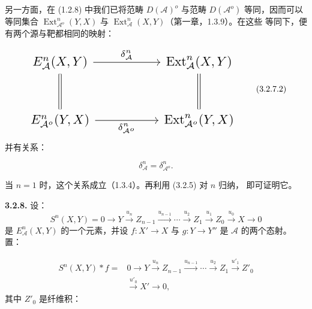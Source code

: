 \clearpage
{}%
\begingroup\small\setlength{\parskip}{0pt}\setlength{\emergencystretch}{1.5em}
\setlength{\abovedisplayskip}{4pt plus 2pt minus 2pt}%
\setlength{\belowdisplayskip}{4pt plus 2pt minus 2pt}%

另一方面，在 (1.2.8) 中我们已将范畴 $D(\mathcal A)^o$ 与范畴
$D(\mathcal A^o)$ 等同，因而可以等同集合
$\operatorname{Ext}_{\mathcal A^o}^{n}(Y,X)$ 与
$\operatorname{Ext}_{\mathcal A}^{n}(X,Y)$（第一章，1.3.9）。在这些
等同下，便有两个源与靶都相同的映射：

\begin{equation}
\resizebox{0.74\textwidth}{!}{%
$\begin{tikzcd}[ampersand replacement=\&,column sep=5.0em,row sep=2.8em]
E_{\mathcal A}^{n}(X,Y)
  \arrow[r,"{\delta_{\mathcal A}^{n}}"]
  \arrow[d,equal]
\& \operatorname{Ext}_{\mathcal A}^{n}(X,Y)
  \arrow[d,equal] \\
E_{\mathcal A^o}^{n}(Y,X)
  \arrow[r,"{\delta_{\mathcal A^o}^{n}}"']
\& \operatorname{Ext}_{\mathcal A^o}^{n}(Y,X)
\end{tikzcd}$%
}
\tag{3.2.7.2}
\end{equation}
并有关系：

\begin{equation}
\delta_{\mathcal A}^{n}=\delta_{\mathcal A^o}^{n}.
\tag{3.2.7.3}
\end{equation}

当 $n=1$ 时，这个关系成立（1.3.4）。再利用 (3.2.5) 对 $n$ 归纳，
即可证明它。

\medskip\noindent\textbf{3.2.8.}\quad
设：
\[
S^n(X,Y)=0\longrightarrow Y\xrightarrow{u_n}Z_{n-1}
\xrightarrow{u_{n-1}}\cdots\xrightarrow{u_2}Z_1
\xrightarrow{u_1}Z_0\xrightarrow{u_0}X\longrightarrow0
\]
是 $E_{\mathcal A}^{n}(X,Y)$ 的一个元素，并设
$f\colon X'\longrightarrow X$ 与 $g\colon Y\longrightarrow Y''$ 是
$\mathcal A$ 的两个态射。置：

\begin{equation}
\begin{aligned}
S^n(X,Y)*f={}&0\longrightarrow Y\xrightarrow{u_n}Z_{n-1}
\xrightarrow{u_{n-1}}\cdots\xrightarrow{u_2}Z_1
\xrightarrow{u'_1}Z'_0\\
&\xrightarrow{u'_0}X'\longrightarrow0,
\end{aligned}
\tag{3.2.8.1}
\end{equation}
其中 $Z'_0$ 是纤维积：

